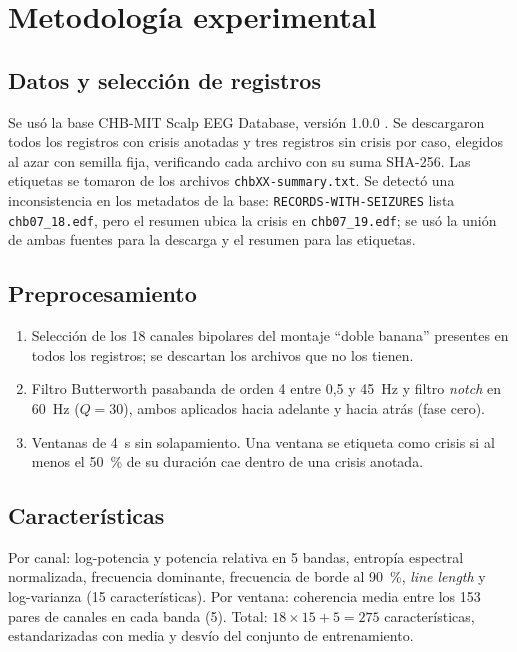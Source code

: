 \chapter{Metodología experimental}
\label{cap:metodologia}

\section{Datos y selección de registros}

Se usó la base CHB-MIT Scalp EEG Database, versión 1.0.0 \parencite{shoeb2009,goldberger2000}. Se descargaron todos los registros con crisis anotadas y tres registros sin crisis por caso, elegidos al azar con semilla fija, verificando cada archivo con su suma SHA-256. Las etiquetas se tomaron de los archivos \texttt{chbXX-summary.txt}. Se detectó una inconsistencia en los metadatos de la base: \texttt{RECORDS-WITH-SEIZURES} lista \texttt{chb07\_18.edf}, pero el resumen ubica la crisis en \texttt{chb07\_19.edf}; se usó la unión de ambas fuentes para la descarga y el resumen para las etiquetas.


\section{Preprocesamiento}

\begin{enumerate}
  \item Selección de los 18 canales bipolares del montaje ``doble banana'' presentes en todos los registros; se descartan los archivos que no los tienen.
  \item Filtro Butterworth pasabanda de orden 4 entre 0,5 y 45~Hz y filtro \emph{notch} en 60~Hz ($Q=30$), ambos aplicados hacia adelante y hacia atrás (fase cero).
  \item Ventanas de 4~s sin solapamiento. Una ventana se etiqueta como crisis si al menos el 50~\% de su duración cae dentro de una crisis anotada.
\end{enumerate}

\section{Características}

Por canal: log-potencia y potencia relativa en 5 bandas, entropía espectral normalizada, frecuencia dominante, frecuencia de borde al 90~\%, \emph{line length} y log-varianza (15 características). Por ventana: coherencia media entre los 153 pares de canales en cada banda (5). Total: $18\times 15 + 5 = 275$ características, estandarizadas con media y desvío del conjunto de entrenamiento.

